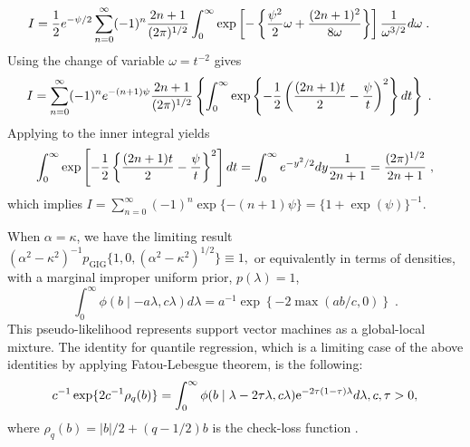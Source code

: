 \documentclass[lineno]{biometrika}
\begin{document}
\begin{align*}
  I & = \frac{1}{2} e^{-\psi/2} \sum_{n=0}^{\infty} (-1)^n \frac{2n+1}{(2 \pi)^{1/2}} 
  \int_0^{\infty} 
  \exp\left[-\left\{ \frac{\psi^2}{2} \omega + \frac{(2n+1)^2}{8 \omega} \right\} \right] \frac{1}{\omega^{3/2}} d\omega
  \;. 
\end{align*}
Using the change of variable $\omega = t^{-2}$ gives
\begin{align*}
  I & = \sum_{n=0}^{\infty} (-1)^n e^{-(n+1)\psi} 
  \frac{2n + 1}{(2 \pi)^{1/2}} 
  \left\{ \int_{0}^{\infty} 
    \exp\left\{-\frac{1}{2} \left( \frac{(2n+1)t}{2} - \frac{\psi}{t}\right)^2 \right\} dt 
  \right\}
  \;.
\end{align*}
Applying \CS{} to the inner integral yields 
\[
\int_{0}^{\infty} 
\exp\left[-\frac{1}{2} \left\{ \frac{(2n+1)t}{2} - \frac{\psi}{t}\right \}^2 \right] dt 
= \int_0^{\infty} e^{-y^2/2} dy \frac{1}{2n+1} = \frac{(2\pi)^{1/2}}{2n+1}
\;,
\]
which implies $I = \sum_{n=0}^{\infty} (-1)^n \exp\{-(n+1) \psi\} = \{1+\exp(\psi)\}^{-1}$. 

\begin{remark}
When $\alpha = \kappa$, we have the limiting result $(\alpha^2-\kappa^2)^{-1} p_{\mathrm{GIG}}\{1,0, (\alpha^2-\kappa^2)^{1/2} \} \equiv 1,$
or equivalently in terms of densities, with a marginal improper uniform prior, $p(\lambda) = 1$,
\begin{equation}
  \int_{0}^{\infty} \phi(b \mid -a\lambda, c\lambda) d\lambda = a^{-1} \exp\left\{-2 \max(ab/c,0)\right\}
  \;. 
  \label{eq:svm}
\end{equation}
This pseudo-likelihood represents support vector machines as a global-local mixture. The identity for quantile regression, which is a limiting case of the above identities by applying Fatou-Lebesgue theorem, is the following: 
\[
c^{-1}\exp\{ 2c^{-1} \rho_q(b) \}= \int_{0}^{\infty} \phi( b \mid \lambda - 2\tau \lambda, c \lambda){\rm e}^{-2\tau(1-\tau)\lambda} d\lambda, c, \tau > 0,
\]
where $\rho_q(b) = \rvert b \lvert / 2 + (q-1/2) b$ is the check-loss function \citep{polson_data_2013}.
\end{remark}
\end{document}
